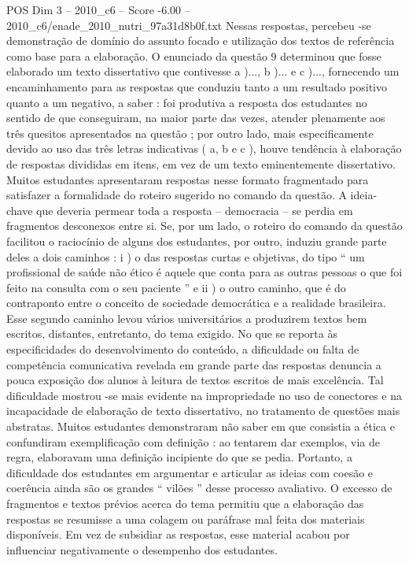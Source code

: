\begin{textsample}{POS Dim 3 – 2010\_c6 – Score -6.00 – 2010\_c6/enade\_2010\_nutri\_97a31d8b0f.txt}
Nessas respostas, percebeu -se demonstração de domínio do assunto focado e utilização dos textos de referência como base para a elaboração.
O enunciado da questão 9 determinou que fosse elaborado um texto dissertativo que contivesse a )..., b )... e c )..., fornecendo um encaminhamento para as respostas que conduziu tanto a um resultado positivo quanto a um negativo, a saber : foi produtiva a resposta dos estudantes no sentido de que conseguiram, na maior parte das vezes, atender plenamente aos três quesitos apresentados na questão ; por outro lado, mais especificamente devido ao uso das três letras indicativas ( a, b e c ), houve tendência à elaboração de respostas divididas em itens, em vez de um texto eminentemente dissertativo.
Muitos estudantes apresentaram respostas nesse formato fragmentado para satisfazer a formalidade do roteiro sugerido no comando da questão.
A ideia-chave que deveria permear toda a resposta – democracia – se perdia em fragmentos desconexos entre si.
Se, por um lado, o roteiro do comando da questão facilitou o raciocínio de alguns dos estudantes, por outro, induziu grande parte deles a dois caminhos : i ) o das respostas curtas e objetivas, do tipo “ um profissional de saúde não ético é aquele que conta para as outras pessoas o que foi feito na consulta com o seu paciente ” e ii ) o outro caminho, que é do contraponto entre o conceito de sociedade democrática e a realidade brasileira.
Esse segundo caminho levou vários universitários a produzirem textos bem escritos, distantes, entretanto, do tema exigido.
No que se reporta às especificidades do desenvolvimento do conteúdo, a dificuldade ou falta de competência comunicativa revelada em grande parte das respostas denuncia a pouca exposição dos alunos à leitura de textos escritos de mais excelência.
Tal dificuldade mostrou -se mais evidente na impropriedade no uso de conectores e na incapacidade de elaboração de texto dissertativo, no tratamento de questões mais abstratas.
Muitos estudantes demonstraram não saber em que consistia a ética e confundiram exemplificação com definição : ao tentarem dar exemplos, via de regra, elaboravam uma definição incipiente do que se pedia.
Portanto, a dificuldade dos estudantes em argumentar e articular as ideias com coesão e coerência ainda são os grandes “ vilões ” desse processo avaliativo.
O excesso de fragmentos e textos prévios acerca do tema permitiu que a elaboração das respostas se resumisse a uma colagem ou paráfrase mal feita dos materiais disponíveis.
Em vez de subsidiar as respostas, esse material acabou por influenciar negativamente o desempenho dos estudantes.

\end{textsample}
